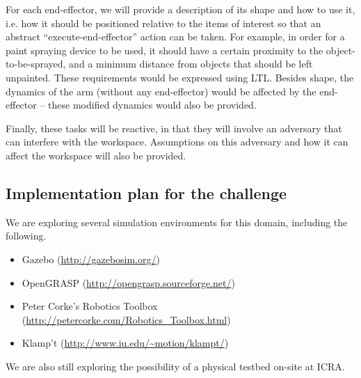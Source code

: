 \documentclass[12pt]{amsart}
\theoremstyle{definition}
\begin{document}
For each end-effector, we will provide a description of its shape and how to use
it, i.e.  how it should be positioned relative to the items of interest so that
an abstract ``execute-end-effector'' action can be taken. For example, in order
for a paint spraying device to be used, it should have a certain proximity to
the object-to-be-sprayed, and a minimum distance from objects that should be
left unpainted. These requirements would be expressed using LTL. Besides shape,
the dynamics of the arm (without any end-effector) would be affected by the
end-effector -- these modified dynamics would also be provided.

Finally, these tasks will be reactive, in that they will involve an adversary
that can interfere with the workspace. Assumptions on this adversary and how it
can affect the workspace will also be provided.

\subsection{Implementation plan for the challenge}

We are exploring several simulation environments for this domain, including the following.
\begin{itemize}
\item Gazebo (\url{http://gazebosim.org/})
\item OpenGRASP (\url{http://opengrasp.sourceforge.net/})
\item Peter Corke's Robotics Toolbox
(\url{http://petercorke.com/Robotics_Toolbox.html})
\item Klamp't (\url{http://www.iu.edu/~motion/klampt/})
\end{itemize}

We are also still exploring the possibility of a physical testbed on-site at ICRA.




\end{document}
